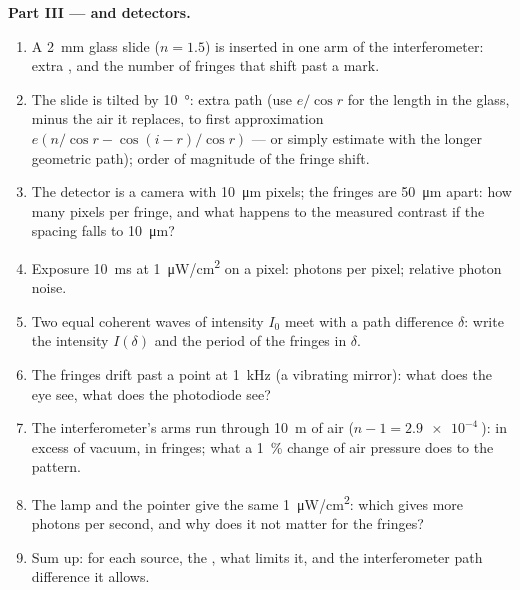 \begin{problem}
\medskip
\noindent\textbf{Part III ---  and detectors.}
\begin{enumerate}[resume]
  \item A \qty{2}{mm} glass slide ($n = 1.5$) is inserted in one arm of
        the interferometer: extra , and the number of
        fringes that shift past a mark.
  \item The slide is tilted by \qty{10}{\degree}: extra path (use $e/\cos r$
        for the length in the glass, minus the air it replaces, to
        first approximation $e(n/\cos r - \cos(i - r)/\cos r)$ --- or simply
        estimate with the longer geometric path); order of magnitude
        of the fringe shift.
  \item The detector is a camera with \qty{10}{\micro m} pixels; the fringes
        are \qty{50}{\micro m} apart: how many pixels per fringe, and what
        happens to the measured contrast if the spacing falls to
        \qty{10}{\micro m}?
  \item Exposure \qty{10}{ms} at \qty{1}{\micro W/cm^2} on a pixel: photons per
        pixel; relative photon noise.
  \item Two equal coherent waves of intensity $I_0$ meet with a path
        difference $\delta$: write the intensity $I(\delta)$ and the period
        of the fringes in $\delta$.
  \item The fringes drift past a point at \qty{1}{kHz} (a vibrating
        mirror): what does the eye see, what does the photodiode see?
  \item The interferometer's arms run through \qty{10}{m} of air ($n - 1 =
        \qty{2.9e-4}{}$):  in excess of vacuum, in fringes;
        what a \qty{1}{\%} change of air pressure does to the pattern.
  \item The lamp and the pointer give the same \qty{1}{\micro W/cm^2}: which
        gives more photons per second, and why does it not matter for
        the fringes?
  \item Sum up: for each source, the , what limits it,
        and the interferometer path difference it allows.
\end{enumerate}
\end{problem}
